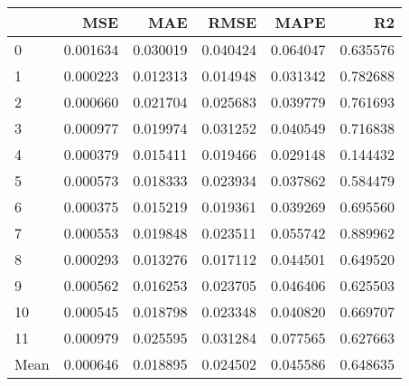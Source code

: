 \begin{tabular}{lrrrrr}
\toprule
 & MSE & MAE & RMSE & MAPE & R2 \\
\midrule
0 & 0.001634 & 0.030019 & 0.040424 & 0.064047 & 0.635576 \\
1 & 0.000223 & 0.012313 & 0.014948 & 0.031342 & 0.782688 \\
2 & 0.000660 & 0.021704 & 0.025683 & 0.039779 & 0.761693 \\
3 & 0.000977 & 0.019974 & 0.031252 & 0.040549 & 0.716838 \\
4 & 0.000379 & 0.015411 & 0.019466 & 0.029148 & 0.144432 \\
5 & 0.000573 & 0.018333 & 0.023934 & 0.037862 & 0.584479 \\
6 & 0.000375 & 0.015219 & 0.019361 & 0.039269 & 0.695560 \\
7 & 0.000553 & 0.019848 & 0.023511 & 0.055742 & 0.889962 \\
8 & 0.000293 & 0.013276 & 0.017112 & 0.044501 & 0.649520 \\
9 & 0.000562 & 0.016253 & 0.023705 & 0.046406 & 0.625503 \\
10 & 0.000545 & 0.018798 & 0.023348 & 0.040820 & 0.669707 \\
11 & 0.000979 & 0.025595 & 0.031284 & 0.077565 & 0.627663 \\
Mean & 0.000646 & 0.018895 & 0.024502 & 0.045586 & 0.648635 \\
\bottomrule
\end{tabular}
